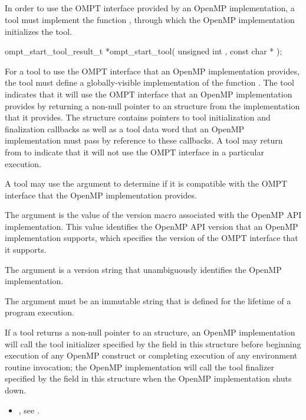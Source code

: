 \subsection{}
\label{sec:ompt_start_tool}

\summary
In order to use the OMPT interface provided by an OpenMP implementation,
a tool must implement the function , through which 
the OpenMP implementation initializes the tool.

\format
\begin{cspecific}
\begin{omptOther}
ompt_start_tool_result_t *ompt_start_tool(
  unsigned int ,
  const char *
);
\end{omptOther}
\end{cspecific}

\descr
For a tool to use the OMPT interface that an OpenMP implementation provides,
the tool must define a globally-visible implementation of the
function . The tool indicates that it will use the OMPT 
interface that an OpenMP implementation provides by returning a non-null 
pointer to an  structure from the 
 implementation that it provides. The 
 structure contains pointers to tool 
initialization and finalization callbacks as well as a tool data word 
that an OpenMP implementation must pass by reference to these callbacks. 
A tool may return  from  to indicate 
that it will not use the OMPT interface in a particular execution.

A tool may use the  argument to determine if it is 
compatible with the OMPT interface that the OpenMP implementation provides.

\argdesc
The argument  is the value of the  version macro
associated with the OpenMP API implementation. This value identifies the OpenMP 
API version that an OpenMP implementation supports, which specifies the version 
of the OMPT interface that it supports.

The argument  is a version string that unambiguously 
identifies the OpenMP implementation.

\constraints
The argument  must be an immutable string that is defined 
for the lifetime of a program execution.

\effect
If a tool returns a non-null pointer to an  
structure, an OpenMP implementation will call the tool initializer specified 
by the  field in this structure before beginning execution 
of any OpenMP construct or completing execution of any environment routine 
invocation; the OpenMP implementation will call the tool finalizer specified 
by the  field in this structure when the OpenMP implementation 
shuts down.

\crossreferences
\begin{itemize}
\item {}, see
.
\end{itemize}

